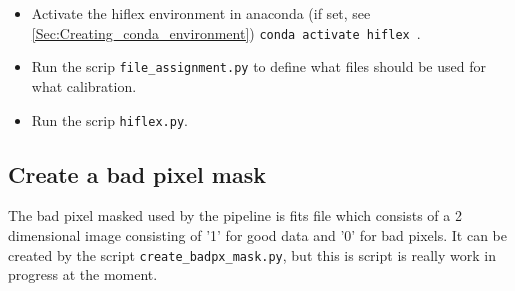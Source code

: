 \documentclass[10pt,a4paper]{article}
\begin{document}
\begin{itemize}
  \item Activate the hiflex environment in anaconda (if set, see \ref{Sec:Creating_conda_environment}) \verb|conda activate hiflex|~.
    
  \item Run the scrip \verb|file_assignment.py| to define what files should be used for what calibration.
    
  \item Run the scrip \verb|hiflex.py|.

\end{itemize}


\subsection{Create a bad pixel mask}
\label{Section:create_badpxmask}
\noindent The bad pixel masked used by the pipeline is fits file which consists of a 2 dimensional image consisting of '1' for good data and '0' for bad pixels. It can be created by the script \verb|create_badpx_mask.py|, but this is script is really work in progress at the moment.
\end{document}
